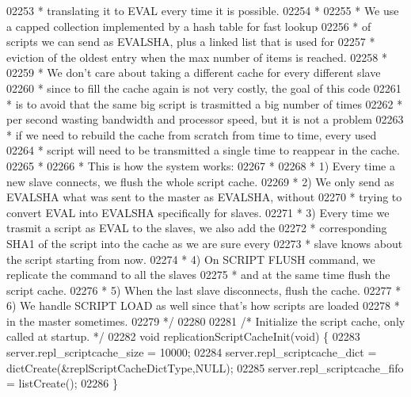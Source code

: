 \begin{DoxyCode}
{{{{{{{{{{{{{{{{{{{{{{{{{{{{{{{{{{{{{{{{{{{{{{{{{{{{{{{{{{{{{{{{{{{{{{{{{{{02253 \textcolor{comment}{ * translating it to EVAL every time it is possible.}
02254 \textcolor{comment}{ *}
02255 \textcolor{comment}{ * We use a capped collection implemented by a hash table for fast lookup}
02256 \textcolor{comment}{ * of scripts we can send as EVALSHA, plus a linked list that is used for}
02257 \textcolor{comment}{ * eviction of the oldest entry when the max number of items is reached.}
02258 \textcolor{comment}{ *}
02259 \textcolor{comment}{ * We don't care about taking a different cache for every different slave}
02260 \textcolor{comment}{ * since to fill the cache again is not very costly, the goal of this code}
02261 \textcolor{comment}{ * is to avoid that the same big script is trasmitted a big number of times}
02262 \textcolor{comment}{ * per second wasting bandwidth and processor speed, but it is not a problem}
02263 \textcolor{comment}{ * if we need to rebuild the cache from scratch from time to time, every used}
02264 \textcolor{comment}{ * script will need to be transmitted a single time to reappear in the cache.}
02265 \textcolor{comment}{ *}
02266 \textcolor{comment}{ * This is how the system works:}
02267 \textcolor{comment}{ *}
02268 \textcolor{comment}{ * 1) Every time a new slave connects, we flush the whole script cache.}
02269 \textcolor{comment}{ * 2) We only send as EVALSHA what was sent to the master as EVALSHA, without}
02270 \textcolor{comment}{ *    trying to convert EVAL into EVALSHA specifically for slaves.}
02271 \textcolor{comment}{ * 3) Every time we trasmit a script as EVAL to the slaves, we also add the}
02272 \textcolor{comment}{ *    corresponding SHA1 of the script into the cache as we are sure every}
02273 \textcolor{comment}{ *    slave knows about the script starting from now.}
02274 \textcolor{comment}{ * 4) On SCRIPT FLUSH command, we replicate the command to all the slaves}
02275 \textcolor{comment}{ *    and at the same time flush the script cache.}
02276 \textcolor{comment}{ * 5) When the last slave disconnects, flush the cache.}
02277 \textcolor{comment}{ * 6) We handle SCRIPT LOAD as well since that's how scripts are loaded}
02278 \textcolor{comment}{ *    in the master sometimes.}
02279 \textcolor{comment}{ */}
02280 
02281 \textcolor{comment}{/* Initialize the script cache, only called at startup. */}
02282 \textcolor{keywordtype}{void} replicationScriptCacheInit(\textcolor{keywordtype}{void}) \{
02283     server.repl\_scriptcache\_size = 10000;
02284     server.repl\_scriptcache\_dict = dictCreate(&replScriptCacheDictType,NULL);
02285     server.repl\_scriptcache\_fifo = listCreate();
02286 \}
}}}}}}}}}}}}}}}}}}}}}}}}}}}}}}}}}}}}}}}}}}}}}}}}}}}}}}}}}}}}}}}}}}}}}}}}}}}
\end{DoxyCode}
